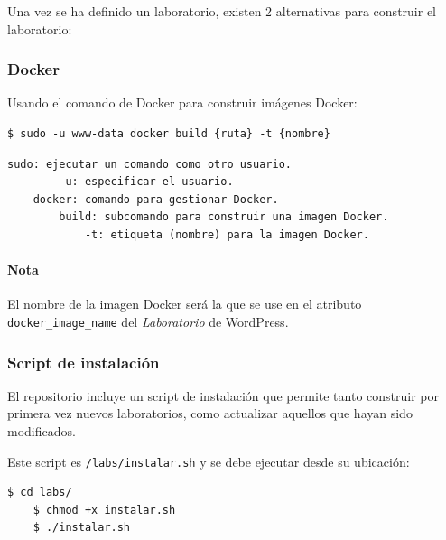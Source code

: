             Una vez se ha definido un laboratorio, existen 2 alternativas para construir el laboratorio:

            \subsubsection{Docker}

                Usando el comando de Docker para construir imágenes Docker:
                \\

                \begin{lstlisting}[style=bash_style]
    $ sudo -u www-data docker build {ruta} -t {nombre}
                \end{lstlisting}

                \begin{lstlisting}[style=comment_style]
    sudo: ejecutar un comando como otro usuario.
        -u: especificar el usuario.
    docker: comando para gestionar Docker.
        build: subcomando para construir una imagen Docker.
            -t: etiqueta (nombre) para la imagen Docker.
                \end{lstlisting}

                \paragraph{Nota}

                    El nombre de la imagen Docker será la que se use en el atributo \texttt{docker\_image\_name} del \textit{Laboratorio} de WordPress.

            \subsubsection{Script de instalación}

                El repositorio incluye un script de instalación que permite tanto construir por primera vez nuevos laboratorios, como actualizar aquellos que hayan sido modificados.

                Este script es \texttt{/labs/instalar.sh} y se debe ejecutar desde su ubicación:
                \\

                \begin{lstlisting}[style=bash_style]
    $ cd labs/
    $ chmod +x instalar.sh
    $ ./instalar.sh
                \end{lstlisting}

